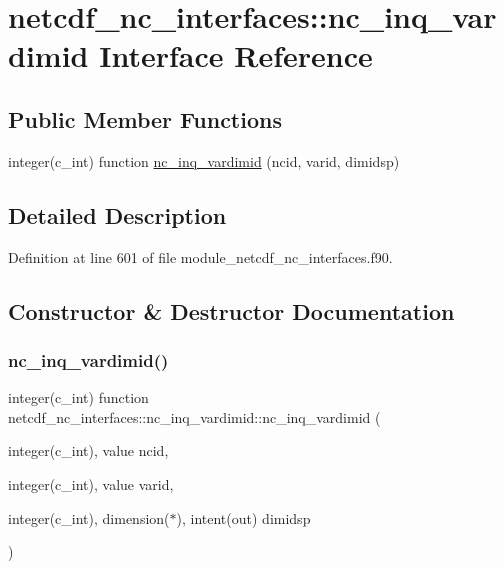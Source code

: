 \hypertarget{interfacenetcdf__nc__interfaces_1_1nc__inq__vardimid}{}\section{netcdf\+\_\+nc\+\_\+interfaces\+:\+:nc\+\_\+inq\+\_\+vardimid Interface Reference}
\label{interfacenetcdf__nc__interfaces_1_1nc__inq__vardimid}
\subsection*{Public Member Functions}
\begin{DoxyCompactItemize}
\item 
integer(c\+\_\+int) function \hyperlink{interfacenetcdf__nc__interfaces_1_1nc__inq__vardimid_a43d422bdbe7a6ccbd7637cd0bdeeffbe}{nc\+\_\+inq\+\_\+vardimid} (ncid, varid, dimidsp)
\end{DoxyCompactItemize}


\subsection{Detailed Description}


Definition at line 601 of file module\+\_\+netcdf\+\_\+nc\+\_\+interfaces.\+f90.



\subsection{Constructor \& Destructor Documentation}
\mbox{\label{interfacenetcdf__nc__interfaces_1_1nc__inq__vardimid_a43d422bdbe7a6ccbd7637cd0bdeeffbe}} 
\subsubsection{\texorpdfstring{nc\+\_\+inq\+\_\+vardimid()}{nc\_inq\_vardimid()}}
{\footnotesize\ttfamily integer(c\+\_\+int) function netcdf\+\_\+nc\+\_\+interfaces\+::nc\+\_\+inq\+\_\+vardimid\+::nc\+\_\+inq\+\_\+vardimid (\begin{DoxyParamCaption}\item[{integer(c\+\_\+int), value}]{ncid,  }\item[{integer(c\+\_\+int), value}]{varid,  }\item[{integer(c\+\_\+int), dimension($\ast$), intent(out)}]{dimidsp }\end{DoxyParamCaption})}



